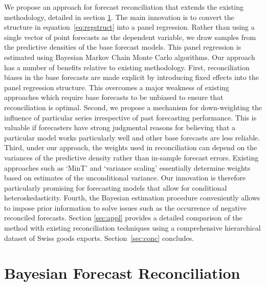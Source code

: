 \documentclass[a4paper,fleqn,11pt]{article}
\begin{document}
We propose an approach for forecast reconciliation that extends the existing methodology, detailed in section \ref{sec:model}. The main innovation is to convert the structure in equation~\ref{eq:regstruct} into a panel regression. Rather than using a single vector of point forecasts as the dependent variable, we draw samples from the predictive densities of the base forecast models. This panel regression is estimated using Bayesian Markov Chain Monte Carlo algorithms. Our approach has a number of benefits relative to existing methodology. First, reconciliation biases in the base forecasts are made explicit by introducing fixed effects into the panel regression structure. This overcomes a major weakness of existing approaches which require base forecasts to be unbiased to ensure that reconciliation is optimal. Second, we propose a mechanism for down-weighting the influence of particular series irrespective of past forecasting performance. This is valuable if forecasters have strong judgmental reasons for believing that a particular model works particularly well and other base forecasts are less reliable. Third, under our approach, the weights used in reconciliation can depend on the variances of the predictive density rather than in-sample forecast errors.  Existing approaches such as `MinT' and `variance scaling' essentially determine weights based on estimates of the unconditional variance. Our innovation is therefore particularly promising for forecasting models that allow for conditional heteroskedasticity. Fourth, the Bayesian estimation procedure conveniently allows to impose prior information to solve issues such as the occurrence of negative reconciled forecasts. Section \ref{sec:appl} provides a detailed comparison of the method with existing reconciliation techniques using a comprehensive hierarchical dataset of Swiss goods exports. Section~\ref{sec:conc} concludes.

\clearpage

\section{Bayesian Forecast Reconciliation}
\label{sec:model}
\end{document}
